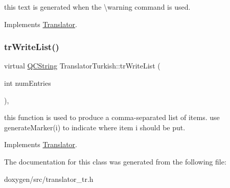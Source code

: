 this text is generated when the \textbackslash{}warning command is used. 

Implements \mbox{\hyperlink{class_translator}{Translator}}.

\mbox{\label{class_translator_turkish_a726ec6b0d3a976ad8a44f300849c3b13}} 
\subsubsection{\texorpdfstring{trWriteList()}{trWriteList()}}
{\footnotesize\ttfamily virtual \mbox{\hyperlink{class_q_c_string}{Q\+C\+String}} Translator\+Turkish\+::tr\+Write\+List (\begin{DoxyParamCaption}\item[{int}]{num\+Entries }\end{DoxyParamCaption})\hspace{0.3cm}{\ttfamily [inline]}, {\ttfamily [virtual]}}

this function is used to produce a comma-\/separated list of items. use generate\+Marker(i) to indicate where item i should be put. 

Implements \mbox{\hyperlink{class_translator}{Translator}}.



The documentation for this class was generated from the following file\+:\begin{DoxyCompactItemize}
\item 
doxygen/src/translator\+\_\+tr.\+h\end{DoxyCompactItemize}
